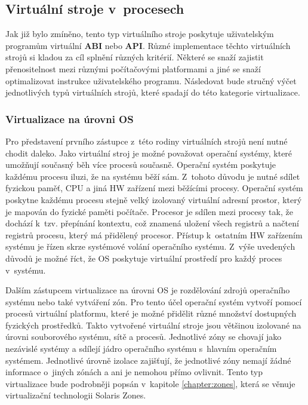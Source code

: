 \subsection{Virtuální stroje v~procesech}
\label{chapter:virtualization:clasification:process_vm}
Jak již bylo zmíněno, tento typ virtuálního stroje poskytuje uživatelským programům virtuální \textbf{ABI} nebo \textbf{API}.
Různé implementace těchto virtuálních strojů si kladou za cíl splnění různých kritérií. Některé se snaží zajistit přenositelnost
mezi různými počítačovými platformami a jiné se snaží optimalizovat instrukce uživatelského programu. Následovat bude stručný
výčet jednotlivých typů virtuálních strojů, které spadají do této kategorie virtualizace.      
\subsubsection{Virtualizace na úrovni OS}
\label{chapter:virtualization:clasification:process_vm:os_level_virtualization}
Pro představení prvního zástupce z~této rodiny virtuálních strojů není nutné chodit daleko. Jako virtuální stroj je možné považovat
operační systémy, které umožňují současný běh více procesů současně. Operační systém poskytuje každému procesu iluzi, že na
systému běží sám. Z~tohoto důvodu je nutné sdílet fyzickou paměť, CPU a jiná HW zařízení mezi běžícími procesy. Operační systém
poskytne každému procesu stejně velký izolovaný virtuální adresní prostor, který je mapován do fyzické paměti počítače. Procesor
je sdílen mezi procesy tak, že dochází k~tzv. přepínání kontextu, což znamená uložení všech registrů a načtení registrů
procesu, který má přidělený procesor. Přístup k~ostatním HW zařízením systému je řízen skrze systémové volání operačního systému.
Z~výše uvedených důvodů je možné říct, že OS poskytuje virtuální prostředí pro každý proces v~systému.

Dalším zástupcem virtualizace na úrovni OS je rozdělování zdrojů operačního systému nebo také vytváření zón. Pro tento účel
operační systém vytvoří pomocí procesů virtuální platformu, které je možné přidělit různé množství dostupných fyzických 
prostředků. Takto vytvořené virtuální stroje jsou většinou izolované na úrovni souborového systému, sítě a procesů. Jednotlivé
zóny se chovají jako nezávislé systémy a sdílejí jádro operačního systému s~hlavním operačním systémem. Jednotlivé úrovně 
izolace zajišťují, že jednotlivé zóny nemají žádné informace o~jiných zónách a ani je nemohou přímo ovlivnit. Tento typ
virtualizace bude podrobněji popsán v~kapitole \ref{chapter:zones}, která se věnuje virtualizační technologii Solaris Zones.   
